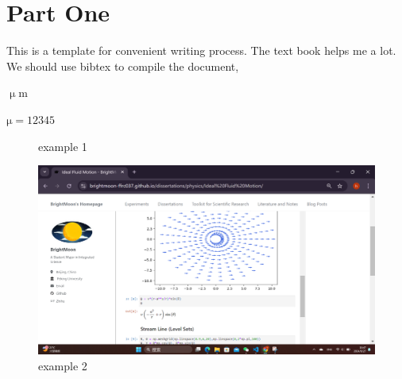 \documentclass[UTF-8]{article}
\begin{document}
\section{Part One}
This is a template for convenient writing process.
The text book helps\cite{TheCell} me a lot.
We should use bibtex to compile the document,


$\upmu\mathrm{m}$

$\mathrm{\mu}=12345$

 \begin{figure}
    \centering
    \caption{example 1}  
    \label{example 1}
 \end{figure}

\begin{figure}
    \centering
    \includegraphics[width=0.7\linewidth]{../Figures/example 3.png}
    \caption{example 2}
    \label{example 2}
\end{figure}
\end{document}
